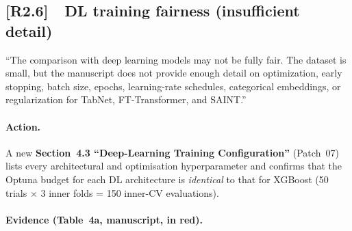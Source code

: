 \documentclass[11pt,a4paper]{article}
\newcommand{\cid}[1]{\textcolor{revred}{\textbf{[#1]}}}
\newcommand{\sectref}[1]{Section~#1}
\newcommand{\stress}[1]{\textbf{#1}}
\begin{document}
\begin{itemize}
\subsection*{\cid{R2.6}~~DL training fairness (insufficient detail)}

\begin{reviewerquote}
``The comparison with deep learning models may not be fully fair. The dataset is small, but the manuscript does not provide enough detail on optimization, early stopping, batch size, epochs, learning-rate schedules, categorical embeddings, or regularization for TabNet, FT-Transformer, and SAINT.''
\end{reviewerquote}

\paragraph{Action.} A new \stress{\sectref{4.3} ``Deep-Learning Training Configuration''} (Patch~07) lists every architectural and optimisation hyperparameter and confirms that the Optuna budget for each DL architecture is \emph{identical} to that for XGBoost (50 trials $\times$ 3 inner folds = 150 inner-CV evaluations).

\paragraph{Evidence (Table~4a, manuscript, in red).}


\end{itemize}
\end{document}
